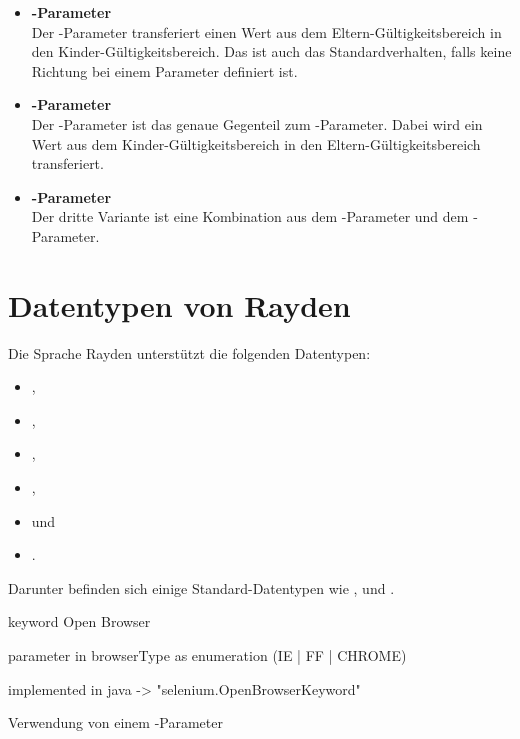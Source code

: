 \begin{itemize}
\item \textbf{-Parameter}\\
Der -Parameter transferiert einen Wert aus dem Eltern-Gültigkeitsbereich in den Kinder-Gültigkeitsbereich. Das ist auch das Standardverhalten, falls keine Richtung bei einem Parameter definiert ist.\\

\item \textbf{-Parameter}\\
Der -Parameter ist das genaue Gegenteil zum -Parameter. Dabei wird ein Wert aus dem Kinder-Gültigkeitsbereich in den Eltern-Gültigkeitsbereich transferiert. \\

\item \textbf{-Parameter}\\
Der dritte Variante ist eine Kombination aus dem -Parameter und dem -Parameter.\\
\end{itemize}

\section{Datentypen von Rayden}

Die Sprache Rayden unterstützt die folgenden Datentypen:

\begin{itemize}
\item {},
\item {},
\item {},
\item {},
\item {} und
\item {}.
\end{itemize}

\SuperPar
Darunter befinden sich einige Standard-Datentypen wie ,  und . 

\begin{program}
\begin{JavaCode}
keyword Open Browser { 
	parameter in browserType as enumeration (IE | FF | CHROME)

	implemented in java -> "selenium.OpenBrowserKeyword"
}
\end{JavaCode}
\caption{Verwendung von einem -Parameter}
\label{prog:enum}
\end{program}

